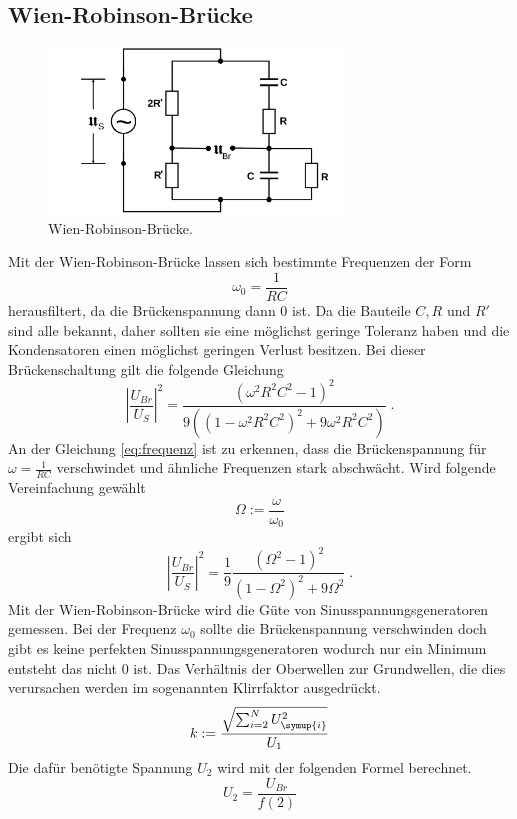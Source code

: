 \subsection{Wien-Robinson-Brücke}
\begin{figure}
  \centering
  \includegraphics[width=0.7\textwidth]{Bilder/Wien_Robinsonbruecke.png}
  \caption{Wien-Robinson-Brücke\cite{sample}.}
  \label{fig:WBBruecke}
\end{figure}
Mit der Wien-Robinson-Brücke lassen sich bestimmte Frequenzen der Form
\begin{equation}
\omega_0=\frac{1}{RC}
\end{equation}
herausfiltert, da die Brückenspannung dann $0$ ist. Da die Bauteile $C,R$ und $R'$
sind alle bekannt, daher sollten sie eine möglichst geringe Toleranz haben und
die Kondensatoren einen möglichst geringen Verlust besitzen. Bei dieser
Brückenschaltung gilt die folgende Gleichung
\begin{equation}
  \left|\frac{U_{Br}}{U_S}\right|^2=\frac{(\omega^2R^2C^2-1)^2}
  {9\left((1-\omega^2 R^2 C^2)^2+9\omega^2R^2C^2\right)} \;.
  \label{eq:frequenz}
\end{equation}
An der Gleichung \eqref{eq:frequenz} ist zu erkennen, dass die Brückenspannung
für $\omega=\frac{1}{RC}$ verschwindet und ähnliche Frequenzen stark abschwächt.
Wird folgende Vereinfachung gewählt
\begin{equation}
\Omega:=\frac{\omega}{\omega_0}
\end{equation}
ergibt sich
\begin{equation}
  \left|\frac{U_{Br}}{U_S}\right|^2=\frac{1}{9}\frac{(\Omega^2-1)^2}
  {(1-\Omega^2)^2+9\Omega^2}  \; .
\end{equation}
Mit der Wien-Robinson-Brücke wird die Güte von Sinusspannungsgeneratoren gemessen.
Bei der Frequenz $\omega_0$ sollte die Brückenspannung verschwinden doch gibt es
keine perfekten Sinusspannungsgeneratoren wodurch nur ein Minimum entsteht das nicht
$0$ ist. Das Verhältnis der Oberwellen zur Grundwellen, die dies verursachen werden
im sogenannten Klirrfaktor ausgedrückt.
\begin{equation}
k:=\frac{\sqrt{\sum_{i=2}^N U_\symup{i}^2}}{U_1}
 \label{eqn:klirr}
\end{equation}
Die dafür benötigte Spannung $U_2$ wird mit der folgenden Formel berechnet.
\begin{equation}
U_2=\frac{U_{Br}}{f(2)}
 \label{eqn:U2berechnung}
\end{equation}
\cite{sample}
